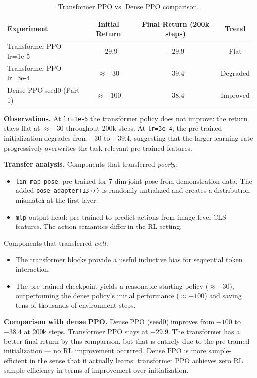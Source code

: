 \documentclass[11pt,letterpaper]{article}
\begin{document}
\begin{table}[h]
\centering
\begin{tabular}{lccc}
\toprule
Experiment & Initial Return & Final Return (200k steps) & Trend \\
\midrule
Transformer PPO lr=1e-5 & $-29.9$ & $-29.9$ & Flat \\
Transformer PPO lr=3e-4 & $\approx -30$ & $-39.4$ & Degraded \\
Dense PPO seed0 (Part 1) & $\approx -100$ & $-38.4$ & Improved \\
\bottomrule
\end{tabular}
\caption{Transformer PPO vs. Dense PPO comparison.}
\end{table}

\textbf{Observations.}
At \texttt{lr=1e-5} the transformer policy does not improve: the return stays flat at $\approx -30$ throughout 200k steps. At \texttt{lr=3e-4}, the pre-trained initialization degrades from $-30$ to $-39.4$, suggesting that the larger learning rate progressively overwrites the task-relevant pre-trained features.

\textbf{Transfer analysis.} Components that transferred \emph{poorly}:
\begin{itemize}
  \item \texttt{lin\_map\_pose}: pre-trained for 7-dim joint pose from demonstration data. The added \texttt{pose\_adapter(13→7)} is randomly initialized and creates a distribution mismatch at the first layer.
  \item \texttt{mlp} output head: pre-trained to predict actions from image-level CLS features. The action semantics differ in the RL setting.
\end{itemize}
Components that transferred \emph{well}:
\begin{itemize}
  \item The transformer blocks provide a useful inductive bias for sequential token interaction.
  \item The pre-trained checkpoint yields a reasonable starting policy ($\approx -30$), outperforming the dense policy's initial performance ($\approx -100$) and saving tens of thousands of environment steps.
\end{itemize}

\textbf{Comparison with dense PPO.} Dense PPO (seed0) improves from $-100$ to $-38.4$ at 200k steps. Transformer PPO stays at $-29.9$. The transformer has a better final return by this comparison, but that is entirely due to the pre-trained initialization — no RL improvement occurred. Dense PPO is more sample-efficient in the sense that it actually learns: transformer PPO achieves zero RL sample efficiency in terms of improvement over initialization.
\end{document}
